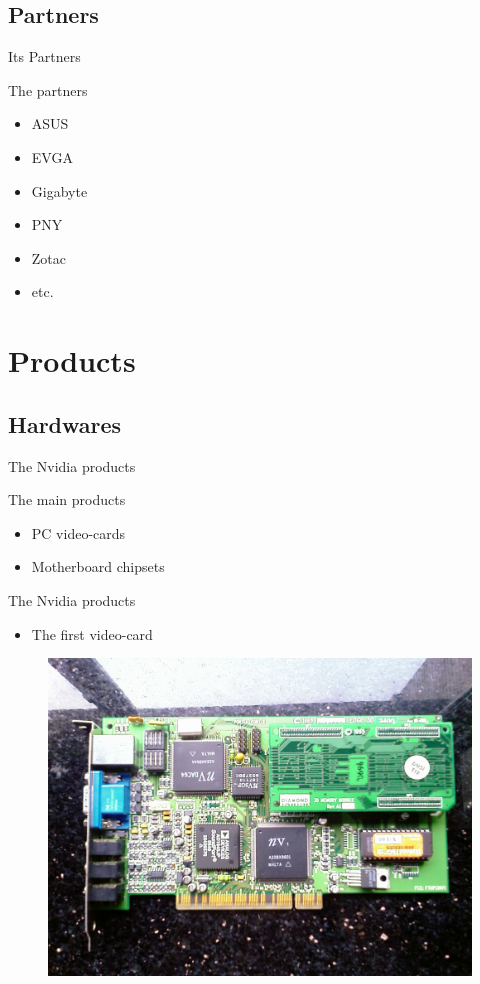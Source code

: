 \documentclass{beamer}
\begin{document}
\subsection{Partners}
\begin{frame}{Its Partners}
	\begin{block}{The partners}
		\begin{itemize}
			\item<+->{ASUS}
			\item<+->{EVGA}
			\item<+->{Gigabyte}
			\item<+->{PNY}
			\item<+->{Zotac}
			\item<+->{etc.}
		\end{itemize}
	\end{block}
\end{frame}

\section{Products}
\subsection{Hardwares}
\begin{frame}{The Nvidia products}
	\transdissolve[duration=0.1]
	\begin{block}{The main products}
		\begin{itemize}
			\item<+->{PC video-cards}
			\item<+->{Motherboard chipsets}
		\end{itemize}
	\end{block}
\end{frame}

\begin{frame}{The Nvidia products}
	\transdissolve[duration=0.08]
	\begin{itemize}
		\item<+->{The first video-card}
	\end{itemize}
	\begin{figure}[h]
		\includegraphics[width=1.00\textheight]{images/First_video_card.png}
	\end{figure}
\end{frame}
\end{document}
